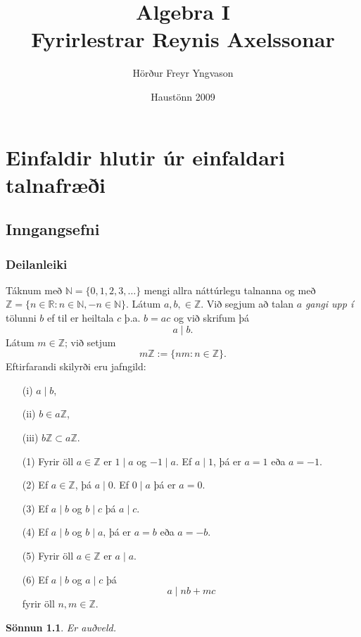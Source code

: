 \documentclass[a4paper,icelandic,11pt]{book}
\title{\textbf{Algebra I} \\ Fyrirlestrar Reynis Axelssonar}
\author{Hörður Freyr Yngvason}
\date{Haustönn 2009}
\theoremstyle{plain}
\newtheorem*{sonnun}{Sönnun}
\newcommand{\R}{\mathbb{R}}
\newcommand{\N}{\mathbb{N}}
\newcommand{\Z}{\mathbb{Z}}
\begin{document}
\normalem %

\maketitle
\tableofcontents


\part{Einfaldir hlutir úr einfaldari talnafræði}
\chapter{Inngangsefni}
\section{Deilanleiki}
Táknum með $\N = \{ 0,1,2,3,\dots \}$ mengi allra náttúrlegu talnanna og með
$\Z = \{n\in\R:n\in\N, -n\in\N\}$. Látum $a,b,\in\Z$. Við segjum að talan $a$
\emph{gangi upp í } tölunni $b$ ef til er heiltala $c$ þ.a. $b=ac$ og við
skrifum þá 
\[
  a\mid b .
\]
Látum $m\in\Z$; við setjum \[m\Z := \{nm:n\in\Z \}. \]
Eftirfarandi skilyrði eru jafngild:
\begin{itemize}
  \item [(i)] $a\mid b$,
  \item [(ii)] $b\in a\Z$,
  \item [(iii)] $b\Z\subset a\Z $.
\end{itemize}
\begin{setn}
  \begin{itemize}
  \item [(1)] Fyrir öll $a\in \Z$ er $1\mid a$ og $-1\mid a$. Ef $a\mid 1$, þá er $a=1$ eða $a=-1$.
  \item [(2)] Ef $a\in\Z$, þá $a\mid 0$. Ef $0\mid a$ þá er $a=0$.
  \item [(3)] Ef $a\mid b$ og $b\mid c$ þá $a\mid c$.
  \item [(4)] Ef $a\mid b$ og $b\mid a$, þá er $a=b$ eða $a=-b$.
  \item [(5)] Fyrir öll $a\in\Z$ er $a\mid a$.
  \item [(6)] Ef $a\mid b$ og $a\mid c$ þá \[a\mid nb + mc \] fyrir öll $n,m\in\Z$.
  \end{itemize}
\end{setn}
\begin{sonnun}
  Er auðveld.
\end{sonnun}
\end{document}
